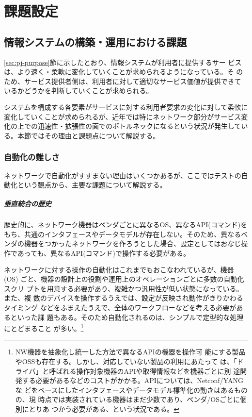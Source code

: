 
\chapter{課題設定}
\label{chap:problem-setting}

 \section{情報システムの構築・運用における課題}
 \label{sec:system-problem}

\ref{sec:pj-purpose}節に示したとおり、情報システムが利用者に提供するサー
ビスは、より速く・柔軟に変化していくことが求められるようになっている。そ
のため、サービス提供者側は、利用者に対して適切なサービス価値が提供できて
いるかどうかを判断していくことが求められる。

システムを構成する各要素がサービスに対する利用者要求の変化に対して柔軟に
変化していくことが求められるが、近年では特にネットワーク部分がサービス変
化の上での迅速性・拡張性の面でのボトルネックになるという状況が発生してい
る。本節ではその理由と課題点について解説する。


  \subsection{自動化の難しさ}
  \label{sec:difficulty}

ネットワークで自動化がすすまない理由はいくつかあるが、ここではテストの自
動化という観点から、主要な課題について解説する。

    \paragraph{垂直統合の歴史}
歴史的に、ネットワーク機器はベンダごとに異なるOS、異なるAPI(コマンド)を
もち、共通のインタフェースやデータモデルが存在しない。そのため、異なるベ
ンダの機器をつかったネットワークを作ろうとした場合、設定としてはおなじ操
作であっても、異なるAPI(コマンド)で操作する必要がある。

ネットワークに対する操作の自動化はこれまでもおこなわれているが、機器(OS)
ごと、機器の設計上の役割や運用上のオペレーションごとに多数の自動化スクリ
プトを用意する必要があり、複雑かつ汎用性が低い状態になっている。また、複
数のデバイスを操作するうえでは、設定が反映され動作がきりかわるタイミング
などをふまえたうえで、全体のワークフローなどを考える必要があるといった課
題もある。そのため自動化されるのは、シンプルで定型的な処理にとどまること
が多い。\footnote{NW機器を抽象化し統一した方法で異なるAPIの機器を操作可
能にする製品やOSSも存在する。しかし、対応していない製品の利用にあたって
は、「ドライバ」と呼ばれる操作対象機器のAPIや取得情報などを機器ごとに別
途開発する必要があるなどのコストがかかる。APIについては、Netconf/YANGな
どをベースにしたインタフェースやデータモデル標準化の動きはあるものの、現
時点では実装されている機器はまだ少数であり、ベンダ/OSごとに個別にとりあ
つかう必要がある、という状況である。}

